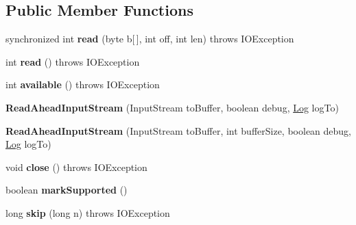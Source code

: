 \subsection*{Public Member Functions}
\begin{DoxyCompactItemize}
\item 
\mbox{\label{classcom_1_1mysql_1_1jdbc_1_1util_1_1_read_ahead_input_stream_af04c1985845f4e02a50a5cc46826395b}} 
synchronized int {\bfseries read} (byte b\mbox{[}$\,$\mbox{]}, int off, int len)  throws I\+O\+Exception 
\item 
\mbox{\label{classcom_1_1mysql_1_1jdbc_1_1util_1_1_read_ahead_input_stream_a899aa63cdf05b3f0bf72b68b47d71fcd}} 
int {\bfseries read} ()  throws I\+O\+Exception 
\item 
\mbox{\label{classcom_1_1mysql_1_1jdbc_1_1util_1_1_read_ahead_input_stream_a83b1a13644162614d56d3098913fd39f}} 
int {\bfseries available} ()  throws I\+O\+Exception 
\item 
\mbox{\label{classcom_1_1mysql_1_1jdbc_1_1util_1_1_read_ahead_input_stream_aaa001fbd419be132b28bb37239735682}} 
{\bfseries Read\+Ahead\+Input\+Stream} (Input\+Stream to\+Buffer, boolean debug, \mbox{\hyperlink{interfacecom_1_1mysql_1_1jdbc_1_1log_1_1_log}{Log}} log\+To)
\item 
\mbox{\label{classcom_1_1mysql_1_1jdbc_1_1util_1_1_read_ahead_input_stream_ae96ceaf42a851dee9306a78f7c8297c1}} 
{\bfseries Read\+Ahead\+Input\+Stream} (Input\+Stream to\+Buffer, int buffer\+Size, boolean debug, \mbox{\hyperlink{interfacecom_1_1mysql_1_1jdbc_1_1log_1_1_log}{Log}} log\+To)
\item 
\mbox{\label{classcom_1_1mysql_1_1jdbc_1_1util_1_1_read_ahead_input_stream_aaea2bcf801d1e416c9d3c44ee1eff800}} 
void {\bfseries close} ()  throws I\+O\+Exception 
\item 
\mbox{\label{classcom_1_1mysql_1_1jdbc_1_1util_1_1_read_ahead_input_stream_a07a9c6cf316682b8ff23644301947bbd}} 
boolean {\bfseries mark\+Supported} ()
\item 
\mbox{\label{classcom_1_1mysql_1_1jdbc_1_1util_1_1_read_ahead_input_stream_a6261ca73f411c5dd6db2f879a93d23c8}} 
long {\bfseries skip} (long n)  throws I\+O\+Exception 
\end{DoxyCompactItemize}
